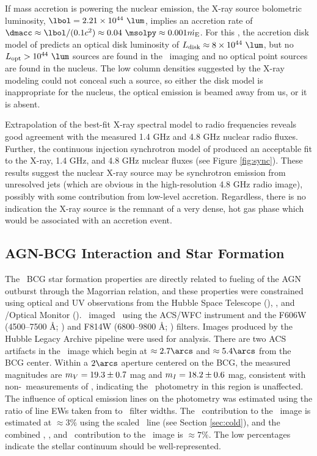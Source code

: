 \documentclass[iop]{emulateapj-rtx4}
\begin{document}
If mass accretion is powering the nuclear emission, the X-ray source
bolometric luminosity, $\lbol = 2.21 \times 10^{44} ~\lum$, implies an
accretion rate of $\dmacc \approx \lbol/(0.1 c^2) \approx 0.04
~\msolpy \approx 0.001 \dme$. For this \dmacc, the accretion disk
model of \citet{2002NewAR..46..247M} predicts an optical disk
luminosity of $\ldisk \approx 8 \times 10^{44} ~\lum$, but no
$L_{\rm{opt}} > 10^{44} ~\lum$ sources are found in the \hst\ imaging
and no optical point sources are found in the nucleus. The low column
densities suggested by the X-ray modeling could not conceal such a
source, so either the disk model is inappropriate for the nucleus, the
optical emission is beamed away from us, or it is absent.

Extrapolation of the best-fit X-ray spectral model to radio
frequencies reveals good agreement with the measured 1.4 GHz and 4.8
GHz nuclear radio fluxes. Further, the continuous injection
synchrotron model of \citet{1987MNRAS.225..335H} produced an
acceptable fit to the X-ray, 1.4 GHz, and 4.8 GHz nuclear fluxes (see
Figure \ref{fig:sync}). These results suggest the nuclear X-ray source
may be synchrotron emission from unresolved jets (which are obvious in
the high-resolution 4.8 GHz radio image), possibly with some
contribution from low-level accretion. Regardless, there is no
indication the X-ray source is the remnant of a very dense, hot gas
phase which would be associated with an accretion event.

\subsection{AGN-BCG Interaction and Star Formation}
\label{sec:bcg}

The \rbs\ BCG star formation properties are directly related to
fueling of the AGN outburst through the Magorrian relation, and these
properties were constrained using optical and UV observations from the
Hubble Space Telescope (\hst), \galex, and \xmm/Optical Monitor
(\xom). \hst\ imaged \rbs\ using the ACS/WFC instrument and the F606W
(4500--7500 \AA; \myv) and F814W (6800--9800 \AA; \myi)
filters. Images produced by the Hubble Legacy Archive pipeline were
used for analysis. There are two ACS artifacts in the \myi\ image
which begin at $\approx 2.7\arcs$ and $\approx 5.4\arcs$ from the BCG
center. Within a $2\arcs$ aperture centered on the BCG, the measured
magnitudes are $m_{V} = 19.3 \pm 0.7$ mag and $m_{I} = 18.2 \pm
0.6$ mag, consistent with non-\hst\ measurements of \citet{rbs1},
indicating the \hst\ photometry in this region is unaffected. The
influence of optical emission lines on the photometry was estimated
using the ratio of line EWs taken from \citet{rbs1} to \hst\ filter
widths. The \halpha\ contribution to the \myi\ image is estimated at
$\approx 3\%$ using the scaled \hbeta\ line (see Section
\ref{sec:cold}), and the combined \hbeta, \oii, and
\oiii\ contribution to the \myv\ image is $\approx 7\%$. The low
percentages indicate the stellar continuum should be well-represented.
\end{document}
